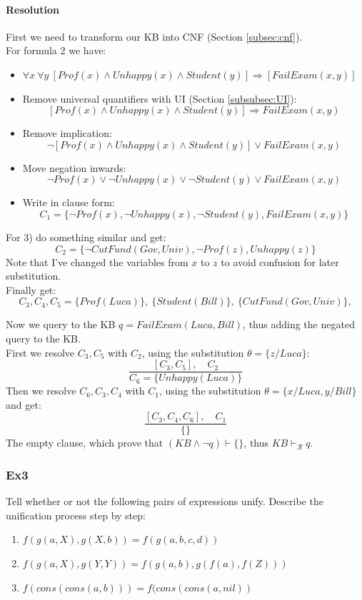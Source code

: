 \documentclass[10pt,a4paper]{article}
\begin{document}
\begin{itemize}
\paragraph{Resolution}
First we need to transform our KB into CNF (Section \ref{subsec:cnf}).\\
For formula 2 we have:
\begin{itemize}
\item $\forall x\ \forall y\ [Prof(x) \wedge Unhappy(x)\wedge Student(y)]\Rightarrow [FailExam(x,y)]$
\item Remove universal quantifiers with UI (Section \ref{subsubsec:UI}):
\[[Prof(x) \wedge Unhappy(x)\wedge Student(y)]\Rightarrow FailExam(x,y)\]
\item Remove implication:
\[\neg [Prof(x) \wedge Unhappy(x)\wedge Student(y)]\vee FailExam(x,y)\]
\item Move negation inwards:
\[\neg Prof(x) \vee \neg Unhappy(x)\vee \neg Student(y)\vee FailExam(x,y)\]
\item Write in clause form:
\[C_1=\lbrace \neg Prof(x), \neg Unhappy(x), \neg Student(y), FailExam(x,y)\rbrace\]
\end{itemize}
For 3) do something similar and get:
\[C_2= \lbrace \neg CutFund(Gov,Univ),\neg Prof(z), Unhappy(z) \rbrace\]
Note that I've changed the variables from $x$ to $z$ to avoid confusion for later substitution.\\
Finally get:
\[C_3,C_4,C_5=\lbrace Prof(Luca) \rbrace,\ \lbrace Student(Bill) \rbrace,\ \lbrace CutFund(Gov,Univ) \rbrace,\]

Now we query to the KB $q= FailExam(Luca,Bill)$, thus adding the negated query to the KB.\\
First we resolve $C_3,C_5$ with $C_2$, using the substitution $\theta=\lbrace z/Luca \rbrace$:
\[\frac{[C_3,C_5],\quad C_2}{C_6=\lbrace Unhappy(Luca) \rbrace}\]
Then we resolve $C_6,C_3,C_4$ with $C_1$, using the substitution $\theta= \lbrace x/Luca, y/Bill \rbrace$ and get:
\[\frac{[C_3,C_4,C_6],\quad C_1}{\lbrace \rbrace}\]
The empty clause, which prove that $(KB \wedge \neg q)\vdash \{\}$, thus $KB \vdash_{\mathcal{R}} q$.


\subsubsection{Ex3}
Tell whether or not the following pairs of expressions unify. Describe the unification process step by step:
\begin{enumerate}
\item $f(g(a, X), g(X, b)) = f(g(a, b, c, d))$
\item $f(g(a, X), g(Y, Y )) = f(g(a, b), g(f(a), f(Z)))$
\item $f (cons(cons(a, b))) = f (cons(cons(a, nil))$
\end{enumerate}


\end{itemize}
\end{document}
